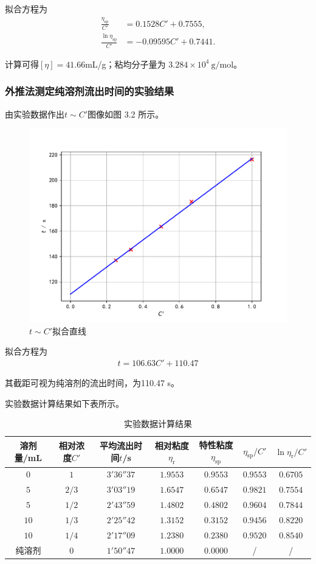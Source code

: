\documentclass[12pt]{ctexart}
\numberwithin{equation}{section}
\begin{document}
拟合方程为
\begin{align}
    \frac{\eta_\text{sp}}{C'} &= 0.1528 C' + 0.7555, \\
    \frac{\ln\eta_\text{sp}}{C'} &= -0.09595 C' + 0.7441.
\end{align}

计算可得$[\eta] = 41.66$mL/g；粘均分子量为
$3.284\times 10^{4}~\mathrm{g/mol}$。

\subsubsection{外推法测定纯溶剂流出时间的实验结果}

由实验数据作出$t\sim C'$图像如图 3.2 所示。
\begin{figure}[!h]
    \centering
    \includegraphics[scale=0.8]{fitting2.pdf}
    \caption{$t\sim C'$拟合直线}
\end{figure}

拟合方程为
\begin{align}
    t = 106.63 C' +110.47
    \tag{I.11}
\end{align}

其截距可视为纯溶剂的流出时间，为110.47 s。

\newpage
实验数据计算结果如下表所示。
\begin{longtable}{ccccccc}
    \caption{实验数据计算结果} \\
    \hline
    溶剂量/mL & 相对浓度$C'$ & 平均流出时间$t$/s & 相对粘度$\eta_\text{r}$ & 特性粘度$\eta_{\text{sp}}$ & $\eta_\text{sp}/C'$ & $\ln\eta_\text{r}/C'$ \\
    \hline
    $0$  & $ 1 $ & $3'36''37$ & $1.9553$ & $0.9553$ & $0.9553$ & $0.6705$ \\
    $5$  & $2/3$ & $3'03''19$ & $1.6547$ & $0.6547$ & $0.9821$ & $0.7554$ \\
    $5$  & $1/2$ & $2'43''59$ & $1.4802$ & $0.4802$ & $0.9604$ & $0.7844$ \\
    $10$ & $1/3$ & $2'25''42$ & $1.3152$ & $0.3152$ & $0.9456$ & $0.8220$ \\
    $10$ & $1/4$ & $2'17''09$ & $1.2380$ & $0.2380$ & $0.9520$ & $0.8540$ \\
    纯溶剂 & $0$ & $1'50''47$ & $1.0000$ & $0.0000$ & / & / \\
    \hline
\end{longtable}
\end{document}
